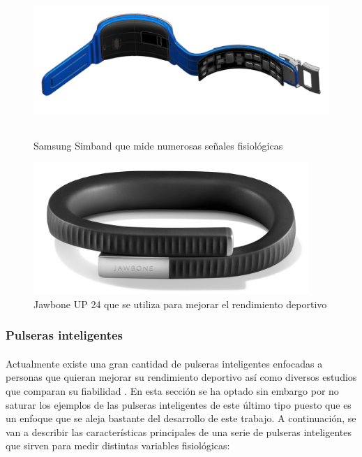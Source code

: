 \begin{figure}[]
   \begin{minipage}{0.48\textwidth}
     \centering
     \includegraphics[width=.7\linewidth, height=5cm]{Imagenes/w7}
    \caption{Samsung Simband que mide numerosas señales fisiológicas}
     \label{fig:w7}
   \end{minipage}\hfill
   \begin {minipage}{0.48\textwidth}
     \centering
     \includegraphics[width=.7\linewidth, height=5cm]{Imagenes/w8}
     \caption{Jawbone UP 24 que se utiliza para mejorar el rendimiento deportivo}
     \label{fig:w8}
   \end{minipage}
\end{figure}


\subsubsection{Pulseras inteligentes}
\label{subsubsec:pulserasInteligentes}
\paragraph{}
Actualmente existe una gran cantidad de pulseras inteligentes enfocadas a personas que quieran mejorar su rendimiento deportivo así como diversos estudios que comparan su fiabilidad \citep{sushames2016validity} \citep{baroni2015fitbit} \citep{kooiman2015reliability}. En esta sección se ha optado sin embargo por no saturar los ejemplos de las pulseras inteligentes de este último tipo puesto que es un enfoque que se aleja bastante del desarrollo de este trabajo. A continuación, se van a describir las características principales de una serie de pulseras inteligentes que sirven para medir distintas variables fisiológicas:

